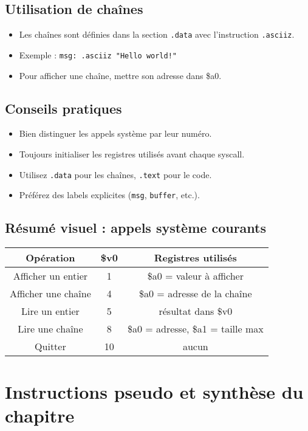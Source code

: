 \documentclass[12pt,a4paper]{article}
\begin{document}
\subsection{Utilisation de chaînes}
\begin{itemize}
  \item Les chaînes sont définies dans la section \texttt{.data} avec l’instruction \texttt{.asciiz}.
  \item Exemple : \texttt{msg: .asciiz "Hello world!"}
  \item Pour afficher une chaîne, mettre son adresse dans \$a0.
\end{itemize}

\subsection{Conseils pratiques}
\begin{itemize}
  \item Bien distinguer les appels système par leur numéro.
  \item Toujours initialiser les registres utilisés avant chaque syscall.
  \item Utilisez \texttt{.data} pour les chaînes, \texttt{.text} pour le code.
  \item Préférez des labels explicites (\texttt{msg}, \texttt{buffer}, etc.).
\end{itemize}

\subsection{Résumé visuel : appels système courants}
\begin{center}
\begin{tabular}{|c|c|c|}
\hline
\textbf{Opération} & \textbf{\$v0} & \textbf{Registres utilisés} \\
\hline
Afficher un entier & 1 & \$a0 = valeur à afficher \\
Afficher une chaîne & 4 & \$a0 = adresse de la chaîne \\
Lire un entier & 5 & résultat dans \$v0 \\
Lire une chaîne & 8 & \$a0 = adresse, \$a1 = taille max \\
Quitter & 10 & aucun \\
\hline
\end{tabular}
\end{center}

\newpage

\section{Instructions pseudo et synthèse du chapitre}
\end{document}
